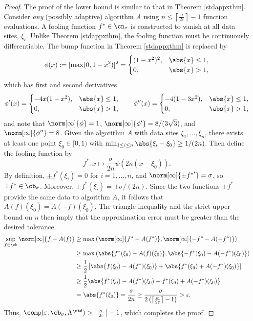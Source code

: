 \begin{proof}
The proof of the lower bound is similar to that in Theorem \ref{stdappxthm}. Consider \emph{any} (possibly adaptive) algorithm $A$ using $n\le \left \lceil \frac{\sigma}{2\varepsilon} \right \rceil - 1$ function evaluations. 
A fooling function $f^* \in \cn_\tau$ is constructed to vanish at all data sites, $\xi_i$.  Unlike Theorem  \ref{stdappxthm}, the fooling function must be continuously differentiable.  The bump function in Theorem \ref{stdappxthm} is replaced by 
\begin{equation} \label{contbump}
\phi(x) : = [\max(0,1-x^2)]^2 = \begin{cases}(1-x^2)^2, & \abs{x} \le 1, \\
0, & \abs{x} > 1,
\end{cases}
\end{equation}
which has first and second derivatives
\begin{equation} \label{contbump}
\phi'(x) = \begin{cases} -4x(1-x^2), & \abs{x} \le 1, \\
0, & \abs{x} > 1,
\end{cases} \qquad 
\phi''(x) = \begin{cases} -4(1-3x^2), & \abs{x} \le 1, \\
0, & \abs{x} > 1,
\end{cases}
\end{equation}
and note that $\norm[\infty]{\phi} = 1$, $\norm[\infty]{\phi'}=8/(3 \sqrt{3})$, and $\norm[\infty]{\phi''}=8$.  Given the algorithm $A$ with data sites $\xi_1, \ldots, \xi_n$, there exists at least one point $\xi_0 \in [0,1)$ with $\min_{1 \le i \le n} \abs{\xi_i -\xi_0} \ge 1/(2n)$.  Then define the fooling function by 
\[
f^*: x \mapsto \frac{\sigma}{2n}\psi(2n(x-\xi_0)).
\]
By definition, $\pm f^*(\xi_i)=0$ for $i=1, \ldots, n$, and $\norm[\infty]{\pm{f^*}'} = \sigma$, so $\pm f^* \in \cb_\sigma$.   Moreover, $\pm f^*(\xi_i)= \pm \sigma/(2n)$.  Since the two functions $\pm f^*$ provide the same data to algorithm $A$, it follows that $A(f)(\xi_0)=A(-f)(\xi_0)$.  The triangle inequality and the strict upper bound on $n$ then imply that the approximation error must be greater than the desired tolerance.
\begin{align*}
\sup_{f \in \cb} \norm[\infty]{f - A(f)} 
&\ge \max\left(\norm[\infty]{f^* - A(f^*)},\norm[\infty]{-f^* - A(- f^*)}\right) \\ 
& \ge \max\left(\abs{f^*(\xi_0) - A(f)(\xi_0)},\abs{-f^*(\xi_0) - A(-f^*)(\xi_0)}\right) \\
& \ge \frac{1}{2} \left [ \abs{f(\xi_0) - A(f^*)(\xi_0)} + \abs{f^*(\xi_0)+ A(-f^*)(\xi_0)} \right ]\\
& \ge \frac{1}{2} \abs{f^*(\xi_0) - A(f^*)(\xi_0) + f^*(\xi_0) + A(-f^*)(\xi_0)}\\
& = \abs{f^*(\xi_0)} = \frac{\sigma}{2n} \ge \frac{\sigma}{2 \left(\left \lceil \frac{\sigma}{2\varepsilon} \right \rceil - 1\right)} > \varepsilon. 
\end{align*}
Thus, $\comp(\varepsilon,\cb_{\sigma},\Lambda^{\std}) > \left \lceil \frac{\sigma}{2\varepsilon} \right \rceil -1$, which completes the proof.
\end{proof}
